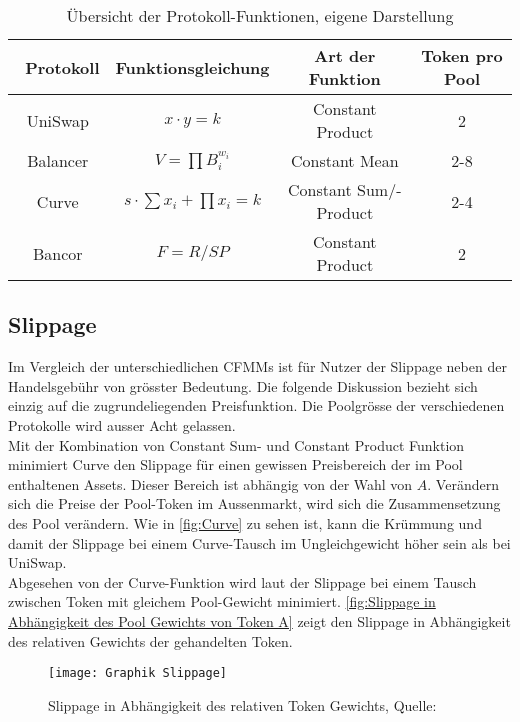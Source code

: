 \documentclass[12pt,a4paper,titlepage,oneside,english]{article}
\begin{document}
\begin{table}[h!]
\renewcommand{\arraystretch}{1.5}
  \center
  \begin{tabular}{cccc}
    \hline\hline\
    Protokoll & Funktionsgleichung & Art der Funktion & Token pro Pool \\ \hline
    UniSwap & $ x \cdot y=k$ & Constant Product &  2  \\    
    Balancer & $V=\prod B_{i}^{w_{i}}$ & Constant Mean  & 2-8 \\ 
    Curve & $s \cdot \sum x_{i}+\prod x_{i} = k $ & Constant Sum/-Product & 2-4  \\
    Bancor & $F=R/SP$ & Constant Product & 2 \\
    \hline\hline
  \end{tabular}
  \caption{Übersicht der Protokoll-Funktionen, eigene Darstellung}
  \label{tbl:Protokolle}
\end{table}

\subsection{Slippage}
Im Vergleich der unterschiedlichen CFMMs ist für Nutzer der Slippage neben der Handelsgebühr von grösster Bedeutung. Die folgende Diskussion bezieht sich einzig auf die zugrundeliegenden Preisfunktion. Die Poolgrösse der verschiedenen Protokolle wird ausser Acht gelassen.\\
Mit der Kombination von Constant Sum- und Constant Product Funktion minimiert Curve den Slippage für einen gewissen Preisbereich der im Pool enthaltenen Assets. Dieser Bereich ist abhängig von der Wahl von $A$. Verändern sich die Preise der Pool-Token im Aussenmarkt, wird sich die Zusammensetzung des Pool verändern. Wie in \autoref{fig:Curve} zu sehen ist, kann die Krümmung und damit der Slippage bei einem Curve-Tausch im Ungleichgewicht höher sein als bei UniSwap.\\
\newpage
Abgesehen von der Curve-Funktion wird laut \cite{Martinelli8020} der Slippage bei einem Tausch zwischen Token mit gleichem Pool-Gewicht minimiert. 
\autoref{fig:Slippage in Abhängigkeit des Pool Gewichts von Token A} zeigt den Slippage in Abhängigkeit des relativen Gewichts der gehandelten Token. \\
	\begin{figure}[h!]
	\begin{center}
	\texttt{[image: Graphik Slippage]}
	\caption{Slippage in Abhängigkeit des relativen Token Gewichts, Quelle: \citet{Martinelli8020} }\label{fig:Slippage in Abhängigkeit des Pool Gewichts von Token A}
	\end{center}
	\end{figure}	
\end{document}
